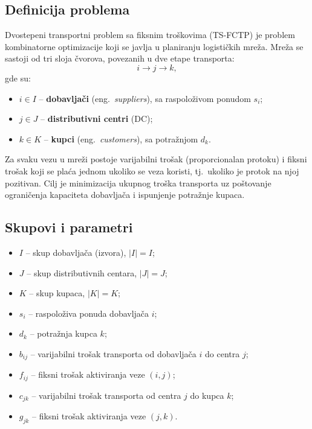 \documentclass[12pt,a4paper]{article}
\begin{document}
\subsection{Definicija problema}

Dvostepeni transportni problem sa fiksnim troškovima (TS-FCTP) je problem
kombinatorne optimizacije koji se javlja u planiranju logističkih mreža.
Mreža se sastoji od tri sloja čvorova, povezanih u dve etape transporta:
\[
i \rightarrow j \rightarrow k,
\]
gde su:
\begin{itemize}
  \item $i \in I$ -- \textbf{dobavljači} (eng.\ \textit{suppliers}), sa raspoloživom ponudom $s_i$;
  \item $j \in J$ -- \textbf{distributivni centri} (DC);
  \item $k \in K$ -- \textbf{kupci} (eng.\ \textit{customers}), sa potražnjom $d_k$.
\end{itemize}

Za svaku vezu u mreži postoje varijabilni trošak (proporcionalan protoku)
i fiksni trošak koji se plaća jednom ukoliko se veza koristi, tj.\ ukoliko
je protok na njoj pozitivan. Cilj je minimizacija ukupnog troška transporta
uz poštovanje ograničenja kapaciteta dobavljača i ispunjenje potražnje kupaca.

\subsection{Skupovi i parametri}
\begin{itemize}
    \item $I$ -- skup dobavljača (izvora), $|I| = I$;
    \item $J$ -- skup distributivnih centara, $|J| = J$;
    \item $K$ -- skup kupaca, $|K| = K$;
    \item $s_i$ -- raspoloživa ponuda dobavljača $i$;
    \item $d_k$ -- potražnja kupca $k$;
    \item $b_{ij}$ -- varijabilni trošak transporta od dobavljača $i$ do centra $j$;
    \item $f_{ij}$ -- fiksni trošak aktiviranja veze $(i,j)$;
    \item $c_{jk}$ -- varijabilni trošak transporta od centra $j$ do kupca $k$;
    \item $g_{jk}$ -- fiksni trošak aktiviranja veze $(j,k)$.
\end{itemize}
\end{document}
